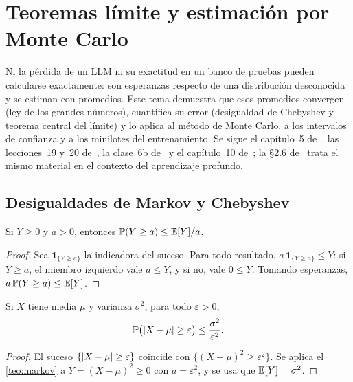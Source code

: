 \chapter{Teoremas límite y estimación por Monte Carlo}
\label{tema:5}

Ni la pérdida de un LLM ni su exactitud en un banco de pruebas pueden calcularse exactamente: son esperanzas respecto de una distribución desconocida y se estiman con promedios. Este tema demuestra que esos promedios convergen (ley de los grandes números), cuantifica su error (desigualdad de Chebyshev y teorema central del límite) y lo aplica al método de Monte Carlo, a los intervalos de confianza y a los minilotes del entrenamiento. Se sigue el capítulo~5 de~\cite{bt}, las lecciones~19 y~20 de~\cite{mit6041}, la clase~6b de~\cite{mit1805} y el capítulo~10 de~\cite{bh}; la §2.6 de~\cite{d2l} trata el mismo material en el contexto del aprendizaje profundo.

\section{Desigualdades de Markov y Chebyshev}

\begin{teorema}\label{teo:markov}
Si $Y\ge 0$ y $a>0$, entonces $\mathbb{P}(Y\ge a)\le\mathbb{E}[Y]/a$.
\end{teorema}

\begin{proof}
Sea $\mathbf{1}_{\{Y\ge a\}}$ la indicadora del suceso. Para todo resultado, $a\,\mathbf{1}_{\{Y\ge a\}}\le Y$: si $Y\ge a$, el miembro izquierdo vale $a\le Y$, y si no, vale $0\le Y$. Tomando esperanzas, $a\,\mathbb{P}(Y\ge a)\le\mathbb{E}[Y]$.
\end{proof}

\begin{teorema}\label{teo:chebyshev}
Si $X$ tiene media $\mu$ y varianza $\sigma^{2}$, para todo $\varepsilon>0$,
\[
\mathbb{P}\bigl(\lvert X-\mu\rvert\ge\varepsilon\bigr)\le\frac{\sigma^{2}}{\varepsilon^{2}}.
\]
\end{teorema}

\begin{proof}
El suceso $\{\lvert X-\mu\rvert\ge\varepsilon\}$ coincide con $\{(X-\mu)^{2}\ge\varepsilon^{2}\}$. Se aplica el \cref{teo:markov} a $Y=(X-\mu)^{2}\ge 0$ con $a=\varepsilon^{2}$, y se usa que $\mathbb{E}[Y]=\sigma^{2}$.
\end{proof}

